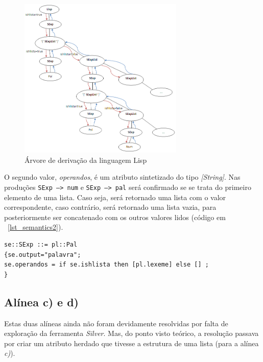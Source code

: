 \documentclass[11pt,a4paper]{article}
\begin{document}
\begin{figure}[h]
\begin{center}
\includegraphics [width=0.7\textwidth] {stuff/diagrama.png}
\caption{Árvore de derivação da linguagem Lisp}\label{fig arv}
\end{center}
\end{figure}

O segundo valor, \emph{operandos}, é um atributo sintetizado do tipo \emph{[String]}. Nas produções \texttt{SExp --> num} e \texttt{SExp --> pal} será confirmado se se trata do primeiro elemento de uma lista. Caso seja, será retornado uma lista com o valor correspondente, caso contrário, será retornado uma lista vazia, para posteriormente ser concatenado com os outros valores lidos (código em ~\ref{lst_semantics2}).\\

\begin{lstlisting}[frame=single, numbers=right, basicstyle=\tiny, caption={Parte do código onde se verifica se é o primeiro elemento da lista}, label={lst_semantics2}]
se::SExp ::= pl::Pal
{se.output="palavra";
se.operandos = if se.ishlista then [pl.lexeme] else [] ;
}
\end{lstlisting}

\subsection{Alínea c) e d)}

Estas duas alíneas ainda não foram devidamente resolvidas por falta de exploração da ferramenta \emph{Silver}. Mas, do ponto visto teórico, a resolução passava por criar um atributo herdado que tivesse a estrutura de uma lista (para a alínea \emph{c)}).
\end{document}

